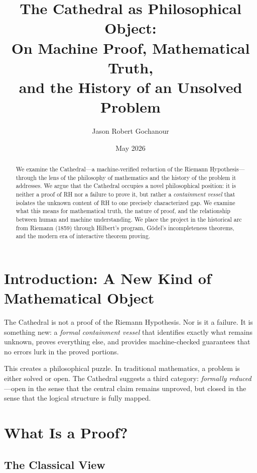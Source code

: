 \documentclass[11pt,a4paper]{article}
\title{%
  The Cathedral as Philosophical Object:\\
  On Machine Proof, Mathematical Truth,\\
  and the History of an Unsolved Problem%
}
\author{Jason Robert Gochanour}
\date{May 2026}
\begin{document}
\maketitle

\begin{abstract}
We examine the Cathedral---a machine-verified reduction of the
Riemann Hypothesis---through the lens of the philosophy of
mathematics and the history of the problem it addresses. We argue
that the Cathedral occupies a novel philosophical position: it is
neither a proof of RH nor a failure to prove it, but rather a
\emph{containment vessel} that isolates the unknown content of RH
to one precisely characterized gap. We examine what this means for
mathematical truth, the nature of proof, and the relationship between
human and machine understanding. We place the project in the
historical arc from Riemann (1859) through Hilbert's program,
G\"odel's incompleteness theorems, and the modern era of interactive
theorem proving.
\end{abstract}

\tableofcontents

\section{Introduction: A New Kind of Mathematical Object}

The Cathedral is not a proof of the Riemann Hypothesis. Nor is it a
failure. It is something new: a \emph{formal containment vessel}
that identifies exactly what remains unknown, proves everything
else, and provides machine-checked guarantees that no errors lurk
in the proved portions.

This creates a philosophical puzzle. In traditional mathematics,
a problem is either solved or open. The Cathedral suggests a third
category: \emph{formally reduced}---open in the sense that the
central claim remains unproved, but closed in the sense that the
logical structure is fully mapped.

\section{What Is a Proof?}

\subsection{The Classical View}
\end{document}

